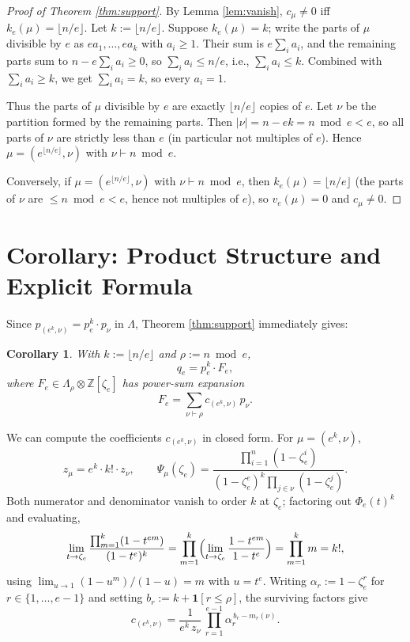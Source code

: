 \documentclass[11pt]{article}
\newtheorem{corollary}[theorem]{Corollary}
\theoremstyle{remark}
\newcommand{\qe}{q_e}
\newcommand{\zetae}{\zeta_e}
\newcommand{\ZZ}{\mathbb{Z}}
\begin{document}
\begin{proof}[Proof of Theorem \ref{thm:support}]
By Lemma \ref{lem:vanish}, $c_\mu \ne 0$ iff $k_e(\mu) = \lfloor n/e \rfloor$. Let $k := \lfloor n/e \rfloor$. Suppose $k_e(\mu) = k$; write the parts of $\mu$ divisible by $e$ as $e a_1, \ldots, e a_k$ with $a_i \ge 1$. Their sum is $e \sum_i a_i$, and the remaining parts sum to $n - e\sum_i a_i \ge 0$, so $\sum_i a_i \le n/e$, i.e., $\sum_i a_i \le k$. Combined with $\sum_i a_i \ge k$, we get $\sum_i a_i = k$, so every $a_i = 1$.

Thus the parts of $\mu$ divisible by $e$ are exactly $\lfloor n/e\rfloor$ copies of $e$. Let $\nu$ be the partition formed by the remaining parts. Then $|\nu| = n - ek = n \bmod e < e$, so all parts of $\nu$ are strictly less than $e$ (in particular not multiples of $e$). Hence $\mu = (e^{\lfloor n/e\rfloor}, \nu)$ with $\nu \vdash n \bmod e$.

Conversely, if $\mu = (e^{\lfloor n/e\rfloor}, \nu)$ with $\nu \vdash n \bmod e$, then $k_e(\mu) = \lfloor n/e\rfloor$ (the parts of $\nu$ are $\le n \bmod e < e$, hence not multiples of $e$), so $v_e(\mu) = 0$ and $c_\mu \ne 0$.
\end{proof}

\section{Corollary: Product Structure and Explicit Formula}

Since $p_{(e^k, \nu)} = p_e^k \cdot p_\nu$ in $\Lambda$, Theorem \ref{thm:support} immediately gives:

\begin{corollary}\label{cor:factor}
With $k := \lfloor n/e \rfloor$ and $\rho := n \bmod e$,
\[
  \qe = p_e^k \cdot F_e,
\]
where $F_e \in \Lambda_\rho \otimes \ZZ[\zetae]$ has power-sum expansion
\[
  F_e = \sum_{\nu \vdash \rho} c_{(e^k, \nu)}\, p_\nu.
\]
\end{corollary}

We can compute the coefficients $c_{(e^k, \nu)}$ in closed form. For $\mu = (e^k, \nu)$,
\[
  z_\mu = e^k \cdot k! \cdot z_\nu, \qquad \Psi_\mu(\zetae) = \frac{\prod_{i=1}^n (1 - \zetae^i)}{(1 - \zetae^e)^k \prod_{j \in \nu}(1 - \zetae^j)}.
\]
Both numerator and denominator vanish to order $k$ at $\zetae$; factoring out $\Phi_e(t)^k$ and evaluating,
\[
  \lim_{t \to \zetae} \frac{\prod_{m=1}^k(1 - t^{em})}{(1 - t^e)^k} = \prod_{m=1}^k \Bigl(\lim_{t \to \zetae}\frac{1 - t^{em}}{1 - t^e}\Bigr) = \prod_{m=1}^k m = k!,
\]
using $\lim_{u \to 1}(1-u^m)/(1-u) = m$ with $u = t^e$. Writing $\alpha_r := 1 - \zetae^r$ for $r \in \{1, \ldots, e-1\}$ and setting $b_r := k + \mathbf{1}[r \le \rho]$, the surviving factors give
\begin{equation}\label{eq:closed}
  c_{(e^k, \nu)} = \frac{1}{e^k\, z_\nu}\, \prod_{r=1}^{e-1} \alpha_r^{\,b_r - m_r(\nu)}.
\end{equation}
\end{document}
